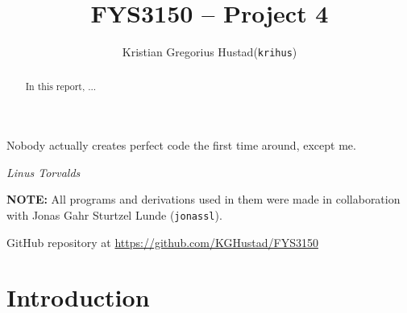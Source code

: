 \documentclass[a4paper]{article}
\begin{document}
\title{FYS3150 -- Project 4}
\author{
    \begin{tabular}{r l}
        Kristian Gregorius Hustad & (\texttt{krihus})
    \end{tabular}}

\maketitle




\setlength{\epigraphwidth}{0.75\textwidth}
\renewcommand{\epigraphflush}{center}
\renewcommand{\beforeepigraphskip}{50pt}
\renewcommand{\afterepigraphskip}{100pt}
\renewcommand{\epigraphsize}{\normalsize}

\epigraph{Nobody actually creates perfect code the first time around, except me.}
{\textit{Linus Torvalds}}


\begin{abstract}
\noindent
In this report, ...
\end{abstract}

\vfill

\textbf{NOTE:} All programs and derivations used in them were made in collaboration with Jonas Gahr Sturtzel Lunde (\texttt{jonassl}).

\bigskip
\begin{center}
    GitHub repository at \url{https://github.com/KGHustad/FYS3150}
\end{center}

\newpage

\newcommand{\half}{\frac{1}{2}}
\newcommand{\dt}{{\Delta t}}
\newcommand{\dx}{{\Delta x}}
\newcommand{\bigO}{{\mathcal{O}}}

\newcommand{\stateset}{{\mathcal{S}}}

\newcommand{\upspin}{\uparrow}
\newcommand{\downspin}{{\color{red}\downarrow}}



\section{Introduction}\label{sec:intro}
\cite{mhj_lecture_notes} %
\end{document}
